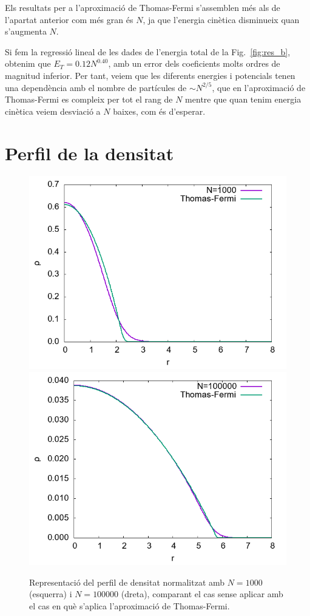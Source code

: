 \documentclass[a4paper]{article}
\begin{document}
Els resultats per a l'aproximació de Thomas-Fermi s'assemblen més als de l'apartat anterior com més gran és $N$, ja que l'energia cinètica disminueix quan s'augmenta $N$.

Si fem la regressió lineal de les dades de l'energia total de la Fig.~\ref{fig:res_b}, obtenim que $E_T = 0.12 N^{0.40}$, amb un error dels coeficients molts ordres de magnitud inferior. Per tant, veiem que les diferents energies i potencials tenen una dependència amb el nombre de partícules de $\sim N^{2/5}$, que en l'aproximació de Thomas-Fermi es compleix per tot el rang de $N$ mentre que quan tenim energia cinètica veiem desviació a $N$ baixes, com és d'esperar.




\section{\bf Perfil de la densitat}


\begin{figure}[H]
    \centering
    \includegraphics[width=0.49\linewidth]{../c1000.png}
    \includegraphics[width=0.49\linewidth]{../c100000.png}
    \caption{Representació del perfil de densitat normalitzat amb $N=1000$ (esquerra) i $N=100000$ (dreta), comparant el cas sense aplicar amb el cas en què s'aplica l'aproximació de Thomas-Fermi.}
    \label{fig:res_c}
\end{figure}
\end{document}
